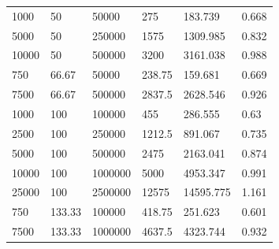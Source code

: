 \documentclass[11pt]{article}
\newcommand{\+}{\discretionary{\mbox{\scriptsize$\hookleftarrow$}}{}{}}
\begin{document}
\begin{table}[]
\begin{tabular}{|l|l|l|l|l||l|}
	1000                    & 50                                & 50000                     & 275                           & 183.739                  & 0.668                                  \\
	5000                    & 50                                & 250000                    & 1575                          & 1309.985                 & 0.832                                  \\
	10000                   & 50                                & 500000                    & 3200                          & 3161.038                 & 0.988                                  \\
	750                     & 66.67                             & 50000                     & 238.75                        & 159.681                  & 0.669                                  \\
	7500                    & 66.67                             & 500000                    & 2837.5                        & 2628.546                 & 0.926                                  \\
	1000                    & 100                               & 100000                    & 455                           & 286.555                  & 0.63                                   \\
	2500                    & 100                               & 250000                    & 1212.5                        & 891.067                  & 0.735                                  \\
	5000                    & 100                               & 500000                    & 2475                          & 2163.041                 & 0.874                                  \\
	10000                   & 100                               & 1000000                   & 5000                          & 4953.347                 & 0.991                                  \\
	25000                   & 100                               & 2500000                   & 12575                         & 14595.775                & 1.161                                  \\
	750                     & 133.33                            & 100000                    & 418.75                        & 251.623                  & 0.601                                  \\
	7500                    & 133.33                            & 1000000                   & 4637.5                        & 4323.744                 & 0.932                                  \\

\end{tabular}
\end{table}
\end{document}
